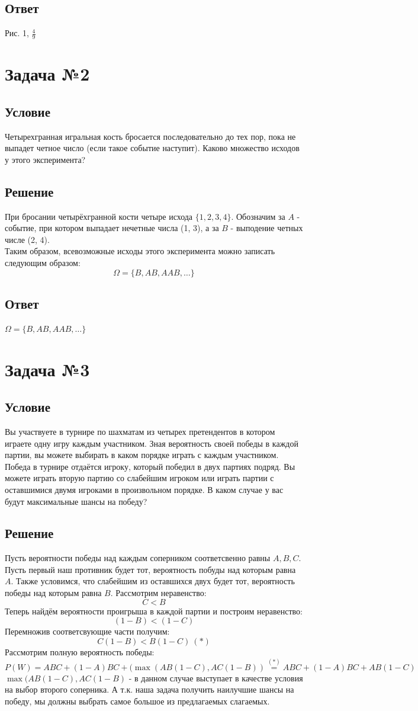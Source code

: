 \documentclass{article}
\begin{document}
\subsection*{Ответ}
Рис. 1, $\frac{4}{9}$
\newpage
\section*{Задача №2}
\subsection*{Условие}
Четырехгранная игральная кость бросается последовательно до тех пор,
пока не выпадет четное число (если такое событие наступит). Каково множество
исходов у этого эксперимента?
\subsection*{Решение}
При бросании четырёхгранной кости четыре исхода $\{ 1, 2, 3, 4\}$. Обозначим за $A$ - событие, при котором выпадает нечетные числа (1, 3), а за $B$ - выподение четных числе (2, 4).\\
Таким образом, всевозможные исходы этого эксперимента можно записать следующим образом:
\[
    \Omega = \{B, AB, AAB, \dots \}
\]
\subsection*{Ответ}
$\Omega = \{B, AB, AAB, \dots \}$
\section*{Задача №3}
\subsection*{Условие}
Вы участвуете в турнире по шахматам из четырех претендентов в котором
играете одну игру каждым участником. Зная вероятность своей победы в каждой
партии, вы можете выбирать в каком порядке играть с каждым участником. Победа в
турнире отдаётся игроку, который победил в двух партиях подряд. Вы можете играть
вторую партию со слабейшим игроком или играть партии с оставшимися двумя
игроками в произвольном порядке. В каком случае у вас будут максимальные шансы
на победу? 
\subsection*{Решение}
Пусть вероятности победы над каждым соперником соответсвенно равны $A, B, C$. Пусть первый наш противник будет тот, вероятность побуды над которым равна $A$. Также условимся, что слабейшим из оставшихся двух будет тот, вероятность победы над которым равна $B$. Рассмотрим неравенство:
\[
    C < B
\] 
Теперь найдём вероятности проигрыша в каждой партии и построим неравенство:
\[
    (1 - B) < (1 - C)
\] 
Перемножив соответсвующие части получим:
\[
    C(1 - B) < B(1 - C) \ (*)
\]
Рассмотрим полную вероятность победы:
\[
    P(W) = ABC + (1 - A) BC + ( \max(AB(1-C), AC(1-B) ) \overset{(*)}{=} ABC + (1 - A) BC + AB(1-C)
\]
$\max(AB(1-C), AC(1-B)$ - в данном случае выступает в качестве условия на выбор второго соперника. А т.к. наша задача получить наилучшие шансы на победу, мы должны выбрать самое большое из предлагаемых слагаемых.
\end{document}
